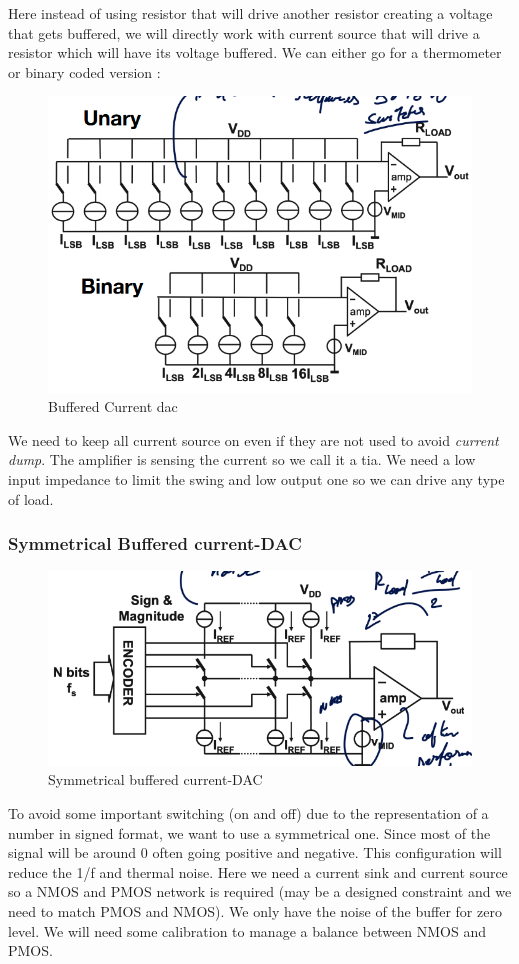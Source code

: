 \documentclass{report}
\begin{document}
Here instead of using resistor that will drive another resistor creating a voltage that gets buffered, we will directly work with current source that will drive a resistor which will have its voltage buffered. We can either go for a thermometer or binary coded version : 

\begin{figure}[H]
    \centering
    \includegraphics[width=0.65\linewidth]{img/Buffered_Current_DAC.png}
    \caption{Buffered Current \gls{dac}}
    \label{fig:enter-label}
\end{figure}

We need to keep all current source on even if they are not used to avoid \textit{current dump}. The amplifier is sensing the current so we call it a \gls{tia}. We need a low input impedance to limit the swing and low output one so we can drive any type of load.

\subsubsection{Symmetrical Buffered current-DAC}

\begin{figure}[H]
    \centering
    \includegraphics[width=0.75\linewidth]{img/sym_dac.png}
    \caption{Symmetrical buffered current-DAC}
    \label{fig:sym-buffered-DAC-label}
\end{figure}

To avoid some important switching (on and off) due to the representation of a number in signed format, we want to use a symmetrical one. Since most of the signal will be around 0 often going positive and negative. This configuration will reduce the 1/f and thermal noise. Here we need a current sink and current source so a NMOS and PMOS network is required (may be a designed constraint and we need to match PMOS and NMOS). We only have the noise of the buffer for zero level. We will need some calibration to manage a  balance between NMOS and PMOS.
\end{document}
